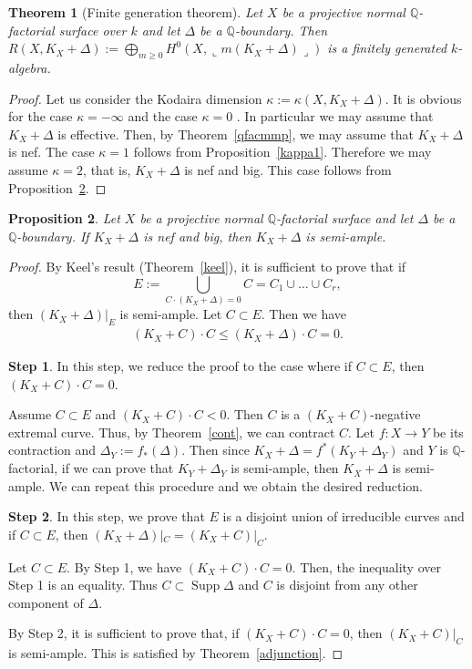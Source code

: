 \documentclass[12pt,twoside]{amsart}
\newcommand{\Supp}[0]{{\operatorname{Supp}}}
\newtheorem{thm}{Theorem}[section]
\newtheorem{prop}[thm]{Proposition}
\theoremstyle{definition}
\newtheorem{step}{Step}
\newcommand{\Q}{$\mathbb{Q}$}
\begin{document}
\begin{thm}[Finite generation theorem]
Let $X$ be a projective normal \Q-factorial surface over $k$ and 
let $\Delta$ be a \Q-boundary. 
Then $R(X, K_X+\Delta):=\bigoplus\limits_{m \geq 0} H^0(X, \llcorner m(K_X+\Delta)\lrcorner)$
is a finitely generated $k$-algebra. 
\end{thm}

\begin{proof}
Let us consider the Kodaira dimension $\kappa:=\kappa(X, K_X+\Delta)$. 
It is obvious for the case $\kappa=-\infty$ and the case $\kappa=0$ . 
In particular we may assume that $K_X+\Delta$ is effective. 
Then, by Theorem~\ref{qfacmmp}, 
we may assume that $K_X+\Delta$ is nef. 
The case $\kappa=1$ follows from Proposition~\ref{kappa1}. 
Therefore we may assume $\kappa=2$, that is, 
$K_X+\Delta$ is nef and big. 
This case follows from Proposition~\ref{nefbig}.
\end{proof}


\begin{prop}\label{nefbig}
Let $X$ be a projective normal \Q-factorial surface and 
let $\Delta$ be a \Q-boundary. 
If $K_X+\Delta$ is nef and big, then $K_X+\Delta$ is semi-ample.
\end{prop}

\begin{proof}
By Keel's result (Theorem~\ref{keel}), 
it is sufficient to prove that 
if 
$$E:=\bigcup\limits_{C\cdot (K_X+\Delta)=0}C=C_1 \cup \dots \cup C_r,$$ 
then $(K_X+\Delta)|_{E}$ is semi-ample. 
Let $C \subset E$. 
Then we have 
\begin{eqnarray*}
(K_X+C)\cdot C \leq (K_X+\Delta)\cdot C=0.
\end{eqnarray*} 


\setcounter{step}{0}
\begin{step}
In this step, we reduce the proof to the case 
where if $C \subset E$, then $(K_X+C)\cdot C=0$. 

Assume $C \subset E$ and $(K_X+C)\cdot C<0$. 
Then $C$ is a $(K_X+C)$-negative extremal curve. 
Thus, by Theorem~\ref{cont}, we can contract $C$. 
Let $f:X \to Y$ be its contraction and $\Delta_Y:=f_*(\Delta)$. 
Then since $K_X+\Delta=f^*(K_Y+\Delta_Y)$ and $Y$ is \Q-factorial, 
if we can prove that $K_Y+\Delta_Y$ is semi-ample, 
then $K_X+\Delta$ is semi-ample. 
We can repeat this procedure and we obtain the desired reduction. 
\end{step}

\begin{step}
In this step, 
we prove that $E$ is a disjoint union of irreducible curves and 
if $C \subset E$, 
then $(K_X+\Delta)|_C=(K_X+C)|_C$. 

Let $C \subset E$. 
By Step 1, we have $(K_X+C)\cdot C=0$. 
Then, the inequality over Step 1 is an equality. 
Thus $C \subset \Supp \Delta$ and 
$C$ is disjoint from any other component of $\Delta$. 
\end{step}

By Step 2, it is sufficient to prove that, 
if $(K_X+C)\cdot C=0$, then $(K_X+C)|_C$ is semi-ample. 
This is satisfied by Theorem~\ref{adjunction}. 
\end{proof}
\end{document}
